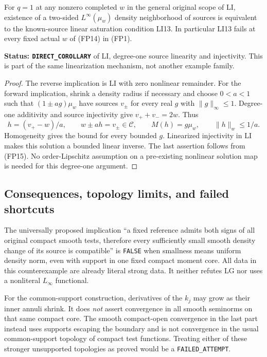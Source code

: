 \begin{corollary}
For $q=1$ at any nonzero completed $w$ in the general original
scope of LI, existence of a two-sided $L^\infty(\mu_w)$ density
neighborhood of sources is equivalent to the known-source linear
saturation condition LI13. In particular LI13 fails at every fixed
actual $w$ of (FP14) in (FP1).
\end{corollary}

\noindent\textbf{Status: \texttt{DIRECT\_COROLLARY}} of LI,
degree-one source linearity and injectivity. This is part of the
same linearization mechanism, not another example family.

\begin{proof}
The reverse implication is LI with zero nonlinear remainder.
For the forward implication, shrink a density radius if necessary
and choose $0<a<1$ such that $(1\pm ag)\mu_w$ have sources
$v_\pm$ for every real $g$ with $\|g\|_\infty\le1$.
Degree-one additivity and source injectivity give
$v_++v_-=2w$. Thus
\[
 h=(v_+-w)/a,\qquad w\pm ah=v_\pm\in\mathscr C,
 \qquad M(h)=g\mu_w,
 \qquad\|h\|_w\le1/a.
 \tag{FP20}
\]
Homogeneity gives the bound for every bounded $g$. Linearized
injectivity in LI makes this solution a bounded linear inverse.
The last assertion follows from (FP15). No order-Lipschitz
assumption on a pre-existing nonlinear solution map is needed
for this degree-one argument.
\end{proof}

\subsection{Consequences, topology limits, and failed shortcuts}

The universally proposed implication
``a fixed reference admits both signs of all original compact
smooth tests, therefore every sufficiently small smooth density
change of its source is compatible'' is \texttt{FALSE} when
smallness means uniform density norm, even with support in one
fixed compact moment core. All data in this counterexample are
already literal strong data. It neither refutes LG nor uses a
nonliteral $L_\infty$ functional.

For the common-support construction, derivatives of the $k_j$ may
grow as their inner annuli shrink. It does \emph{not} assert
convergence in all smooth seminorms on that same compact core.
The smooth compact-open convergence in the last part instead uses
supports escaping the boundary and is not convergence in the
usual common-support topology of compact test functions.
Treating either of these stronger unsupported topologies as proved
would be a \texttt{FAILED\_ATTEMPT}.

